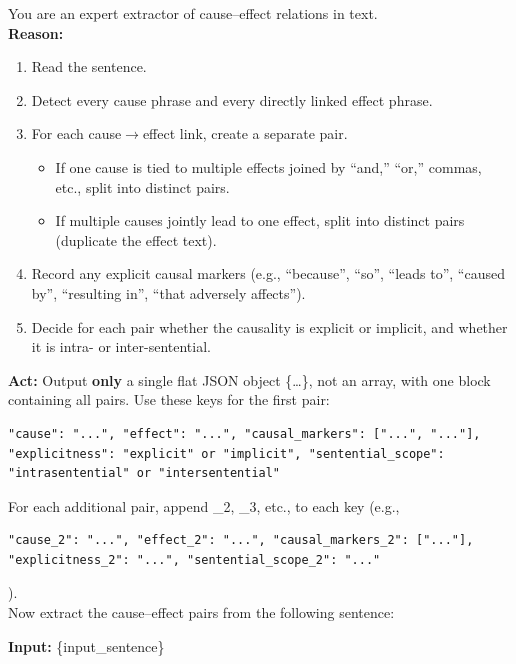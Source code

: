 \documentclass[conference]{IEEEtran}
\begin{document}
\begin{tcolorbox}[
  title=\textbf{5.  Experiment 2: ReAct Style},
  colback=gray!5,
  colframe=black!75,
  fonttitle=\bfseries,
  breakable
]
You are an expert extractor of cause--effect relations in text.\\
\textbf{Reason:}
\begin{enumerate}[label=\arabic*.]
  \item Read the sentence.
  \item Detect every cause phrase and every directly linked effect phrase.
  \item For each cause$\to$effect link, create a separate pair. 
    \begin{itemize}
      \item If one cause is tied to multiple effects joined by ``and,'' ``or,'' commas, etc., split into distinct pairs.
      \item If multiple causes jointly lead to one effect, split into distinct pairs (duplicate the effect text).
    \end{itemize}
  \item Record any explicit causal markers (e.g., ``because'', ``so'', ``leads to'', ``caused by'', ``resulting in'', ``that adversely affects'').
  \item Decide for each pair whether the causality is explicit or implicit, and whether it is intra- or inter-sentential.
\end{enumerate}
\textbf{Act:} Output \textbf{only} a single flat JSON object \{\dots\}, not an array, with one block containing all pairs. Use these keys for the first pair: 
\begin{verbatim}
"cause": "...", "effect": "...", "causal_markers": ["...", "..."], "explicitness": "explicit" or "implicit", "sentential_scope": "intrasentential" or "intersentential"
\end{verbatim}
For each additional pair, append \_2, \_3, etc., to each key (e.g.,
\begin{verbatim}
"cause_2": "...", "effect_2": "...", "causal_markers_2": ["..."], "explicitness_2": "...", "sentential_scope_2": "..."
\end{verbatim}
).\\
Now extract the cause--effect pairs from the following sentence:

\textbf{Input:} \{input\_sentence\}
\end{tcolorbox}
\end{document}
